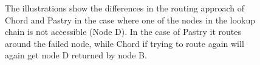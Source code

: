 \begin{figure}[htb]
  \centering
  \caption{The illustrations show the differences in the routing approach of Chord and Pastry in the case where one of the nodes in the lookup chain is not accessible (Node D). In the case of Pastry it routes around the failed node, while Chord if trying to route again will again get node D returned by node B.}
\end{figure}

